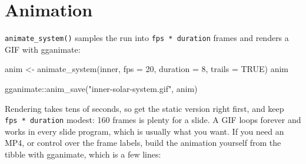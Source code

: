 \documentclass[
  10.5pt,
  letterpaper,
]{scrbook}
\newenvironment{Shaded}{\begin{snugshade}}{\end{snugshade}}
\newcommand{\AttributeTok}[1]{\textcolor[rgb]{0.00,0.00,0.00}{#1}}
\newcommand{\ConstantTok}[1]{\textcolor[rgb]{0.00,0.00,0.00}{#1}}
\newcommand{\DecValTok}[1]{\textcolor[rgb]{0.00,0.00,0.00}{#1}}
\newcommand{\FunctionTok}[1]{\textcolor[rgb]{0.00,0.00,0.00}{#1}}
\newcommand{\NormalTok}[1]{\textcolor[rgb]{0.00,0.00,0.00}{#1}}
\newcommand{\OtherTok}[1]{\textcolor[rgb]{0.00,0.00,0.00}{#1}}
\newcommand{\SpecialCharTok}[1]{\textcolor[rgb]{0.00,0.00,0.00}{#1}}
\newcommand{\StringTok}[1]{\textcolor[rgb]{0.00,0.00,0.00}{#1}}
\theoremstyle{definition}
\theoremstyle{plain}
\theoremstyle{remark}
\begin{document}
\section{Animation}\label{animation}

\texttt{animate\_system()} samples the run into
\texttt{fps\ *\ duration} frames and renders a GIF with gganimate:

\begin{Shaded}
\begin{Highlighting}[]
\NormalTok{anim }\OtherTok{\textless{}{-}} \FunctionTok{animate\_system}\NormalTok{(inner, }\AttributeTok{fps =} \DecValTok{20}\NormalTok{, }\AttributeTok{duration =} \DecValTok{8}\NormalTok{, }\AttributeTok{trails =} \ConstantTok{TRUE}\NormalTok{)}
\NormalTok{anim}
\end{Highlighting}
\end{Shaded}

\begin{Shaded}
\begin{Highlighting}[]
\NormalTok{gganimate}\SpecialCharTok{::}\FunctionTok{anim\_save}\NormalTok{(}\StringTok{"inner{-}solar{-}system.gif"}\NormalTok{, anim)}
\end{Highlighting}
\end{Shaded}

Rendering takes tens of seconds, so get the static version right first,
and keep \texttt{fps\ *\ duration} modest: 160 frames is plenty for a
slide. A GIF loops forever and works in every slide program, which is
usually what you want. If you need an MP4, or control over the frame
labels, build the animation yourself from the tibble with gganimate,
which is a few lines:
\end{document}
